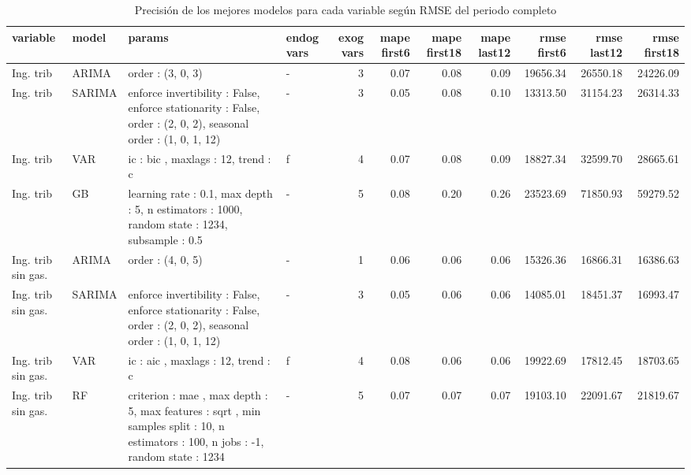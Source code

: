\documentclass[a4paper, 11pt]{article}
\begin{document}
\begin{landscape}
\begin{longtable}{p{5em}p{3.5em}p{13.165em}p{2.835em}rrrrrrr}
\caption{Precisión de los mejores modelos para cada variable según RMSE del periodo completo}\\ 
\textbf{variable} & \textbf{model} & \textbf{params} & \textbf{endog vars} & \multicolumn{1}{p{2.665em}}{\textbf{exog vars}} & \multicolumn{1}{p{2.915em}}{\textbf{mape first6}} & \multicolumn{1}{p{2.915em}}{\textbf{mape first18}} & \multicolumn{1}{p{2.915em}}{\textbf{mape last12}} & \multicolumn{1}{p{3.915em}}{\textbf{rmse first6}} & \multicolumn{1}{p{3.915em}}{\textbf{rmse last12}} & \multicolumn{1}{p{3.915em}}{\textbf{rmse first18}} \\
\hline \hline
 Ing. trib & ARIMA & order : (3, 0, 3)  & -     & 3     & 0.07  & 0.08  & 0.09  & 19656.34 & 26550.18 & 24226.09 \\
\hline
 Ing. trib & SARIMA & enforce invertibility : False,  enforce stationarity : False,  order : (2, 0, 2),  seasonal order : (1, 0, 1, 12)  & -     & 3     & 0.05  & 0.08  & 0.10  & 13313.50 & 31154.23 & 26314.33 \\
\hline
 Ing. trib & VAR   & ic :  bic ,  maxlags : 12,  trend :  c   & f     & 4     & 0.07  & 0.08  & 0.09  & 18827.34 & 32599.70 & 28665.61 \\
\hline
 Ing. trib & GB    & learning rate : 0.1,  max depth : 5,  n estimators : 1000,  random state : 1234,  subsample : 0.5  & -     & 5     & 0.08  & 0.20  & 0.26  & 23523.69 & 71850.93 & 59279.52 \\
\hline
 Ing. trib sin gas. & ARIMA & order : (4, 0, 5)  & -     & 1     & 0.06  & 0.06  & 0.06  & 15326.36 & 16866.31 & 16386.63 \\
\hline
 Ing. trib sin gas. & SARIMA & enforce invertibility : False,  enforce stationarity : False,  order : (2, 0, 2),  seasonal order : (1, 0, 1, 12)  & -     & 3     & 0.05  & 0.06  & 0.06  & 14085.01 & 18451.37 & 16993.47 \\
\hline
 Ing. trib sin gas. & VAR   & ic :  aic ,  maxlags : 12,  trend :  c   & f     & 4     & 0.08  & 0.06  & 0.06  & 19922.69 & 17812.45 & 18703.65 \\
\hline
 Ing. trib sin gas. & RF    & criterion :  mae ,  max depth : 5,  max features :  sqrt ,  min samples split : 10,  n estimators : 100,  n jobs : -1,  random state : 1234  & -     & 5     & 0.07  & 0.07  & 0.07  & 19103.10 & 22091.67 & 21819.67 \\

\end{longtable}
\end{landscape}
\end{document}
